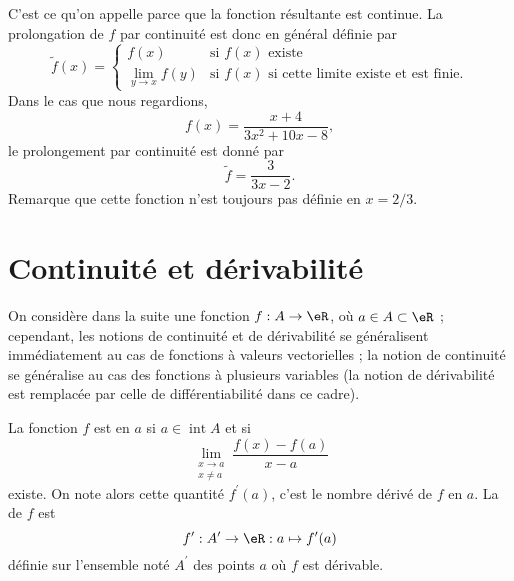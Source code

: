 C'est ce qu'on appelle  parce que la fonction résultante est continue. La prolongation de $f$ par continuité est donc en général définie par
\begin{equation}
\tilde f(x)=
\begin{cases}
f(x)            &\text{si $f(x)$ existe}\\
\lim_{y\to x}f(y)   &\text{si $f(x)$ si cette limite existe et est finie.}
\end{cases}
\end{equation}
Dans le cas que nous regardions, 
\[ 
    f(x)=\frac{ x+4 }{ 3x^2+10x-8 },
\]
le prolongement par continuité est donné par
\begin{equation}
\tilde f =\frac{ 3 }{ 3x-2 }.
\end{equation}
Remarque que cette fonction n'est toujours pas définie en $x=2/3$. 



\section{Continuité et dérivabilité}
\label{seccontetderiv}

On considère dans la suite une fonction $f : A \to \eR$, où $a \in A \subset \eR$ ; cependant, les notions de continuité et de dérivabilité se généralisent immédiatement au cas de fonctions à valeurs vectorielles ; la notion de continuité se généralise au cas des fonctions à plusieurs variables (la notion de dérivabilité est remplacée par celle de différentiabilité dans ce cadre).

\begin{definition}
    La fonction $f$ est  en \( a\) si $a \in
  \operatorname{int} A$ et si
  \begin{equation*}
    \lim_{\substack{x\rightarrow a\\x\neq a}} \frac{f(x)-f(a)}{x-a}
  \end{equation*}
  existe. On note alors cette quantité $f^\prime(a)$, c'est le nombre
  dérivé de $f$ en $a$. La  de $f$ est
  \begin{equation*}
    f^\prime : A^\prime \to \eR : a \mapsto f^\prime(a)
  \end{equation*}
  définie sur l'ensemble noté $A^\prime$ des points $a$ où $f$ est
  dérivable.
\end{definition}

